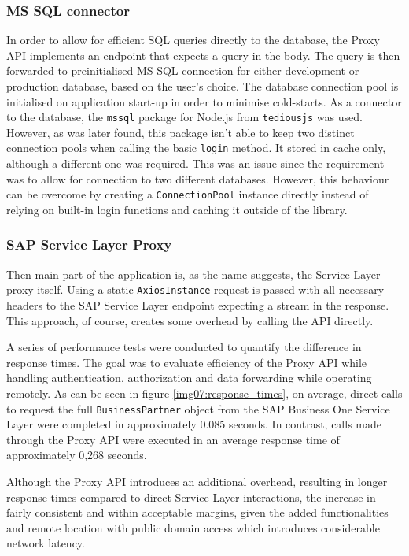 \subsubsection{MS SQL connector}
In order to allow for efficient SQL queries directly to the database, the Proxy API implements an endpoint that expects a query in the body.
The query is then forwarded to preinitialised MS SQL connection for either development or production database, based on the user's choice. 
The database connection pool is initialised on application start-up in order to minimise cold-starts.
As a connector to the database, the \texttt{mssql} package for Node.js from \texttt{tediousjs} was used. However, as was later found, this package isn't able to keep two distinct connection pools when calling the basic \texttt{login} method.
It stored in cache only, although a different one was required. This was an issue since the requirement was to allow for connection to two different databases. 
However, this behaviour can be overcome by creating a \texttt{ConnectionPool} instance directly instead of relying on built-in login functions and caching it outside of the library.

\subsubsection{SAP Service Layer Proxy}
Then main part of the application is, as the name suggests, the Service Layer proxy itself. 
Using a static \texttt{AxiosInstance} request is passed with all necessary headers to the SAP Service Layer endpoint expecting a stream in the response.
This approach, of course, creates some overhead by calling the API directly. 

A series of performance tests were conducted to quantify the difference in response times. 
The goal was to evaluate efficiency of the Proxy API while handling authentication, authorization and data forwarding while operating remotely. 
As can be seen in figure \ref{img07:response_times}, on average, direct calls to request the full \texttt{BusinessPartner} object from the SAP Business One Service Layer were completed in approximately 0.085 seconds. 
In contrast, calls made through the Proxy API were executed in an average response time of approximately 0,268 seconds.

Although the Proxy API introduces an additional overhead, resulting in longer response times compared to direct Service Layer interactions, the increase in fairly consistent and within acceptable margins, given the added functionalities and remote location with public domain access which introduces considerable network latency.


